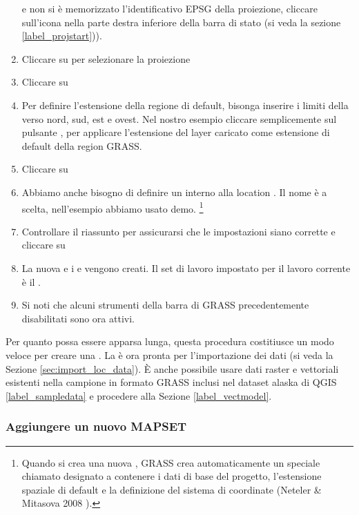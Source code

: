 \begin{enumerate}
   e non si è memorizzato l'identificativo EPSG della
  proiezione, cliccare sull'icona   
  nella parte destra inferiore della barra di stato (si veda la sezione \ref{label_projstart})).
  \item Cliccare su  per selezionare la proiezione
  \item Cliccare su  
  \item Per definire l'estensione della regione di default, bisonga inserire i
  limiti della  verso nord, sud, est e ovest. Nel nostro
  esempio cliccare semplicemente sul pulsante , per applicare l'estensione del layer caricato
   come estensione di default della region GRASS.
  \item Cliccare su  
  \item Abbiamo anche bisogno di definire un  interno alla
  location . Il nome è a scelta, nell'esempio abbiamo
  usato demo.
  \footnote{Quando si crea una nuova , GRASS crea
  automaticamente un  speciale chiamato 
  designato a contenere i dati di base del progetto, l'estensione spaziale di
  default e la definizione del sistema di coordinate (Neteler \& Mitasova 2008 
  \cite{neteler_mitasova08}).}
  \item Controllare il riassunto per assicurarsi che le impostazioni siano
  corrette e cliccare su  
  \item La nuova  e i 
  e  vengono creati. Il set di lavoro impostato per il
  lavoro corrente è il .
  \item Si noti che alcuni strumenti della barra di GRASS precedentemente
  disabilitati sono ora attivi.
\end{enumerate}

Per quanto possa essere apparsa lunga, questa procedura costitiusce un modo
veloce per creare una . La  è ora
pronta per l'importazione dei dati (si veda la Sezione \ref{sec:import_loc_data}).
È anche possibile usare dati raster e vettoriali esistenti nella
 campione in formato GRASS inclusi nel dataset
alaska di QGIS \ref{label_sampledata} e procedere alla Sezione \ref{label_vectmodel}.

\subsubsection{Aggiungere un nuovo MAPSET}\label{sec:add_mapset}

